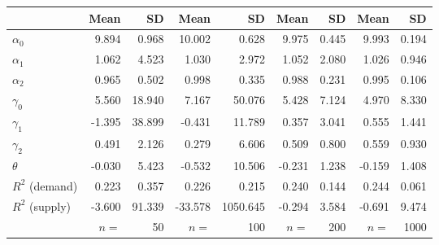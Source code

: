 
\begin{tabular}[t]{lrrrrrrrr}
\toprule
  & Mean & SD & Mean  & SD  & Mean   & SD   & Mean    & SD   \\
\midrule
$\alpha_{0}$ & 9.894 & 0.968 & 10.002 & 0.628 & 9.975 & 0.445 & 9.993 & 0.194\\
$\alpha_{1}$ & 1.062 & 4.523 & 1.030 & 2.972 & 1.052 & 2.080 & 1.026 & 0.946\\
$\alpha_{2}$ & 0.965 & 0.502 & 0.998 & 0.335 & 0.988 & 0.231 & 0.995 & 0.106\\
$\gamma_{0}$ & 5.560 & 18.940 & 7.167 & 50.076 & 5.428 & 7.124 & 4.970 & 8.330\\
$\gamma_{1}$ & -1.395 & 38.899 & -0.431 & 11.789 & 0.357 & 3.041 & 0.555 & 1.441\\
$\gamma_{2}$ & 0.491 & 2.126 & 0.279 & 6.606 & 0.509 & 0.800 & 0.559 & 0.930\\
$\theta$ & -0.030 & 5.423 & -0.532 & 10.506 & -0.231 & 1.238 & -0.159 & 1.408\\
$R^{2}$ (demand) & 0.223 & 0.357 & 0.226 & 0.215 & 0.240 & 0.144 & 0.244 & 0.061\\
$R^{2}$ (supply) & -3.600 & 91.339 & -33.578 & 1050.645 & -0.294 & 3.584 & -0.691 & 9.474\\
 & $n =$ & 50 & $n =$ & 100 & $n =$ & 200 & $n =$ & 1000\\
\bottomrule
\end{tabular}
